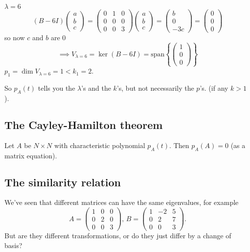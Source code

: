 \documentclass[10pt, a4paper]{article}
\begin{document}
\begin{example}
\begin{enumerate}[label = (\roman*)]
        $\lambda = 6$
        \[
        (B - 6I)\begin{pmatrix}
            a \\ b \\ c
        \end{pmatrix} = \begin{pmatrix}
            0 & 1 & 0 \\
            0 & 0 & 0 \\
            0 & 0 & 3
        \end{pmatrix}\begin{pmatrix}
            a \\ b \\ c
        \end{pmatrix}
        = \begin{pmatrix}
            b \\ 0 \\ -3c
        \end{pmatrix}
        = \begin{pmatrix}
            0 \\ 0 \\ 0
        \end{pmatrix}
        \]
        so now $c$ and $b$ are $0$
        \[
        \implies V_{\lambda = 6} = \ker(B - 6I) = \mathrm{span}\left\{\begin{pmatrix}
            1 \\ 0 \\ 0
        \end{pmatrix}\right\}
        \]
        $p_1 = \dim{V_{\lambda = 6}} = 1 < k_1 = 2$.
    \end{enumerate}
\end{example}
So $p_A(t)$ tells you the $\lambda$'s and the $k$'s,
but not necessarily the $p$'s.
(if any $k > 1$).

\subsection{The Cayley-Hamilton theorem}
\begin{theorem}
    Let $A$ be $N \times N$ with characteristic polynomial $p_A(t)$.
    Then $p_A(A) = 0$
    (as a matrix equation).
\end{theorem}

\subsection{The similarity relation}
We've seen that different matrices can have the same eigenvalues,
for example
\[
A = \begin{pmatrix}
    1 & 0 & 0 \\
    0 & 2 & 0 \\
    0 & 0 & 3
\end{pmatrix},
\,
B = \begin{pmatrix}
    1 & -2 & 5 \\
    0 & 2 & 7 \\
    0 & 0 & 3
\end{pmatrix}.
\]
But are they different transformations,
or do they just differ by a change of basis?
\end{document}
